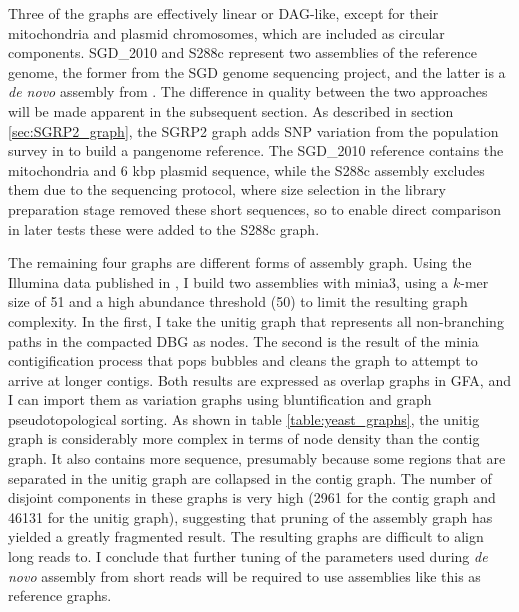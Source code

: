 \documentclass[a4paper,12pt,numbered,oneside]{Classes/PhDThesisPSnPDF}
\begin{document}
Three of the graphs are effectively linear or DAG-like, except for their mitochondria and plasmid chromosomes, which are included as circular components.
SGD\_2010 and S288c represent two assemblies of the reference genome, the former from the SGD genome sequencing project, and the latter is a \emph{de novo} assembly from \cite{yue2017contrasting}.
The difference in quality between the two approaches will be made apparent in the subsequent section.
As described in section \ref{sec:SGRP2_graph}, the SGRP2 graph adds SNP variation from the population survey in \cite{bergstrom2014high} to build a pangenome reference.
The SGD\_2010 reference contains the mitochondria and 6 kbp plasmid sequence, while the S288c assembly excludes them due to the sequencing protocol, where size selection in the library preparation stage removed these short sequences, so to enable direct comparison in later tests these were added to the S288c graph.

The remaining four graphs are different forms of assembly graph.
Using the Illumina data published in \cite{yue2017contrasting}, I build two assemblies with minia3, using a $k$-mer size of 51 and a high abundance threshold (50) to limit the resulting graph complexity.
In the first, I take the unitig graph that represents all non-branching paths in the compacted DBG as nodes.
The second is the result of the minia contigification process that pops bubbles and cleans the graph to attempt to arrive at longer contigs.
Both results are expressed as overlap graphs in GFA, and I can import them as variation graphs using bluntification and graph pseudotopological sorting.
As shown in table \ref{table:yeast_graphs}, the unitig graph is considerably more complex in terms of node density than the contig graph.
It also contains more sequence, presumably because some regions that are separated in the unitig graph are collapsed in the contig graph.
The number of disjoint components in these graphs is very high (2961 for the contig graph and 46131 for the unitig graph), suggesting that pruning of the assembly graph has yielded a greatly fragmented result.
The resulting graphs are difficult to align long reads to.
I conclude that further tuning of the parameters used during \emph{de novo} assembly from short reads will be required to use assemblies like this as reference graphs.
\end{document}
